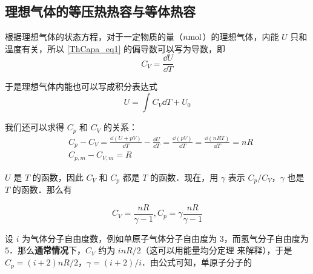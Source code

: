 \subsection{理想气体的等压热热容与等体热容}

根据理想气体的状态方程，对于一定物质的量（$n \rm{mol}$）的理想气体，内能 $U$ 只和温度有关，所以 \autoref{ThCapa_eq1} 的偏导数可以写为导数，即
\begin{equation}
C_V=\frac{\dd U}{\dd T}
\end{equation}

于是理想气体内能也可以写成积分表达式
\begin{equation}
U=\int C_V\dd T + U_0
\end{equation}

我们还可以求得 $C_p$ 和 $C_V$ 的关系：
\begin{align}
&C_p-C_V=\frac{\dd (U+pV)}{\dd T}-\frac{\dd U}{\dd T}=\frac{\dd(pV)}{\dd T}=\frac{\dd (nRT)}{\dd T}=nR\\
&C_{p,m}-C_{V,m}=R
\end{align}

$U$ 是 $T$ 的函数，因此 $C_V$ 和 $C_p$ 都是 $T$ 的函数．现在，用 $\gamma$ 表示 $C_p/C_V$，$\gamma$ 也是 $T$ 的函数．那么有

\begin{equation}
C_V=\frac{nR}{\gamma-1},C_p=\gamma\frac{nR}{\gamma-1}
\end{equation}

设 $i$ 为气体分子自由度数，例如单原子气体分子自由度为 $3$，而氢气分子自由度为 $5$．那么\textbf{通常情况}下，$C_V$ 约为 $inR/2$（这可以用能量均分定理 来解释），于是 $C_p=(i+2)nR/2$，$\gamma=(i+2)/i$．由公式可知，单原子分子的